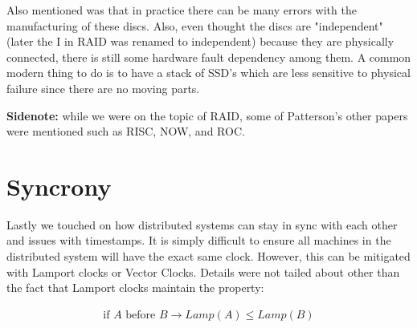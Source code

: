 \documentclass[twoside]{article}
\begin{document}
Also mentioned was that in practice there can be many errors with the manufacturing of these discs. Also, even thought the discs are "independent" (later the I in RAID was renamed to independent) because they are physically connected, there is still some hardware fault dependency among them. A common modern thing to do is to have a stack of SSD's which are less sensitive to physical failure since there are no moving parts.

\textbf{Sidenote:} while we were on the topic of RAID, some of Patterson's other papers were mentioned such as RISC, NOW, and ROC.

\section{Syncrony}
Lastly we touched on how distributed systems can stay in sync with each other and issues with timestamps. It is simply difficult to ensure all machines in the distributed system will have the exact same clock. However, this can be mitigated with Lamport clocks or Vector Clocks. Details were not tailed about other than the fact that Lamport clocks maintain the property:

\begin{gather}
    \text{if }A \text{ before } B \rightarrow Lamp(A) \leq Lamp(B)
\end{gather}
\end{document}
